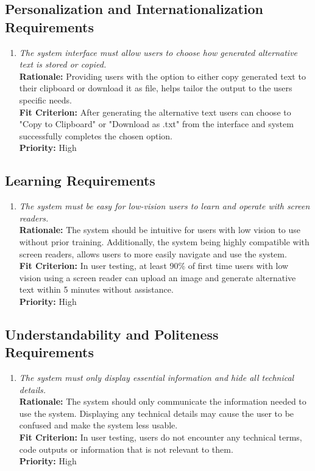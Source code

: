 \documentclass[12pt]{article}
\begin{document}
\subsection{Personalization and Internationalization Requirements}
\begin{enumerate}[label=UHR-PIR \arabic*., wide=0pt, leftmargin=*]
\item \emph{The system interface must allow users to choose how generated alternative text is stored or copied.}\\[2mm] 
    {\bf Rationale:} Providing users with the option to either copy generated text to their clipboard or download it as file, helps tailor the output to the users specific needs.  \\
    {\bf Fit Criterion:} After generating the alternative text users can choose to "Copy to Clipboard" or "Download as .txt" from the interface and system successfully completes the chosen option.\\
    {\bf Priority:} High
\end{enumerate}


\subsection{Learning Requirements}
\begin{enumerate}[label=UHR-LR \arabic*., wide=0pt, leftmargin=*]
\item \emph{The system must be easy for low-vision users to learn and operate with screen readers.}\\[2mm] 
    {\bf Rationale:} The system should be intuitive for users with low vision to use without prior training. Additionally, the system being highly compatible with screen readers, allows users to more easily navigate and use the system.  \\
    {\bf Fit Criterion:} In user testing, at least 90\% of first time users with low vision using a screen reader can upload an image and generate alternative text within 5 minutes without assistance. \\
    {\bf Priority:} High
\end{enumerate}


\subsection{Understandability and Politeness Requirements}
\begin{enumerate}[label=UHR-LR \arabic*., wide=0pt, leftmargin=*]
\item \emph{The system must only display essential information and hide all technical details.}\\[2mm] 
    {\bf Rationale:} The system should only communicate the information needed to use the system. Displaying any technical details may cause the user to be confused and make the system less usable.   \\
    {\bf Fit Criterion:} In user testing, users do not encounter any technical terms, code outputs or information that is not relevant to them.  \\
    {\bf Priority:} High
\end{enumerate}
\end{document}
